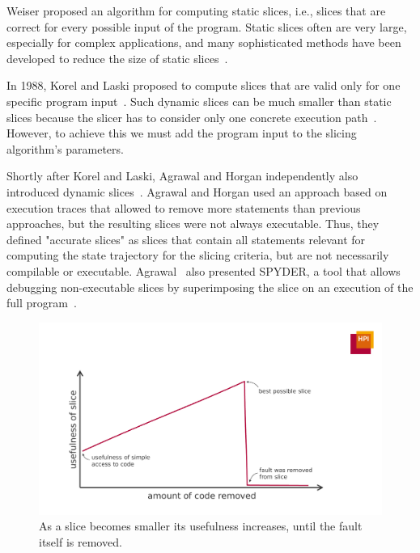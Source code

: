 Weiser proposed an algorithm for computing static slices, i.e., slices that are correct for every possible input of the program.
Static slices often are very large, especially for complex applications, and many sophisticated methods have been developed to reduce the size of static slices~\cite{ottenstein84:the_program_dependence_graph, lyle93:program_slicing_in, hoffner95:evaluation_and_comparison}.

In 1988, Korel and Laski proposed to compute slices that are valid only for one specific program input~\cite{korel88:dynamic_program_slicing}.
Such dynamic slices can be much smaller than static slices because the slicer has to consider only one concrete execution path~\cite{venkatesh95:experimental_results_from_dynamic, hoffner95:evaluation_and_comparison}.
However, to achieve this we must add the program input to the slicing algorithm's parameters.

Shortly after Korel and Laski, Agrawal and Horgan independently also introduced dynamic slices~\cite{agrawal90:dynamic_program_slicing}.
Agrawal and Horgan used an approach based on execution traces that allowed to remove more statements than previous approaches, but the resulting slices were not always executable.
Thus, they defined "accurate slices" as slices that contain all statements relevant for computing the state trajectory for the slicing criteria, but are not necessarily compilable or executable.
Agrawal \etal\ also presented SPYDER, a tool that allows debugging non-executable slices by superimposing the slice on an execution of the full program~\cite{agrawal93:debugging_with_dynamic_slicing}.

\begin{figure}[t]
\centering
\includegraphics[width=.75\linewidth]{img/slice_usefulness}
\caption{As a slice becomes smaller its usefulness increases, until the fault itself is removed.}
\label{fig:slice_usefulness}
\end{figure}

